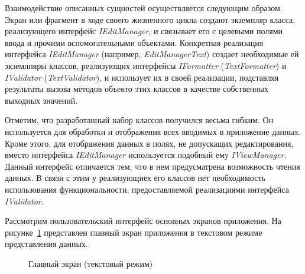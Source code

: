 Взаимодействие описанных сущностей осуществляется следующим образом.
Экран или фрагмент в ходе своего жизненного цикла создают экземпляр класса,
реализующего интерфейс \textit{IEditManager}, и связывает его с целевыми
полями ввода и прочими вспомогательными объектами.
Конкретная реализация интерфейса \textit{IEditManager}
(например, \textit{EditManagerText})
создает необходимые ей экземлпяры классов, реализующих интерфейсы
\textit{IFormatter} (\textit{TextFormatter})
и \textit{IValidator} (\textit{TextValidator}),
и использует их в своей реализации,
подставляя результаты вызова методов объекто этих классов
в качестве собственных выходных значений.

Отметим, что разработанный набор классов получился весьма гибким.
Он используется для обработки и отображения всех вводимых в приложение данных.
Кроме этого, для отображения данных в полях, не допускащих редактирования,
вместо интерфейса \textit{IEditManager} используется подобный ему \textit{IViewManager}.
Данный интерфейс отличается тем, что в нем предусматрена возможность чтения данных.
В связи с этим у реализующиех его классов нет необходимость
использования функциональности, предоставляемой реализациями интерфейса \textit{IValidator}.

Рассмотрим пользовательский интерфейс основных экранов приложения.
На рисунке~\ref{fig:implementation_ui_activity_balance_text}
представлен главный экран приложения в
текстовом режиме представления данных.

\begin{figure}[h!]
  \centering
  \caption{Главный экран (текстовый режим)}
  \label{fig:implementation_ui_activity_balance_text}
\end{figure}

